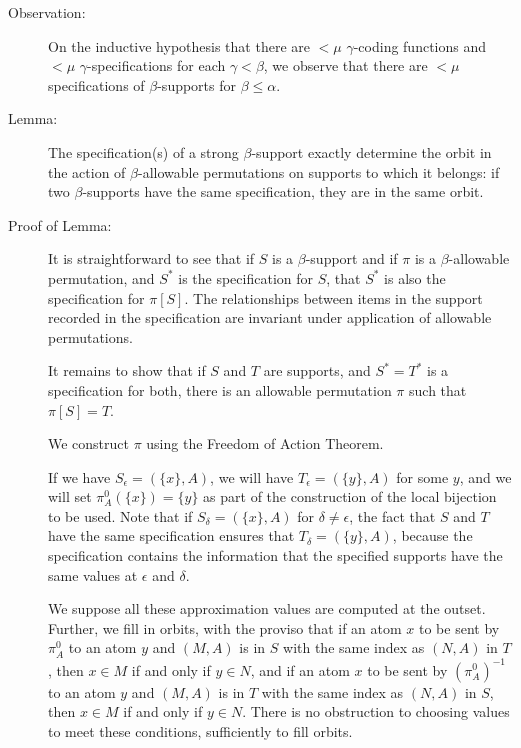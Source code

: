 \documentclass[112pt]{article}
\begin{document}
\begin{description}
\item[Observation:]  On the inductive hypothesis that there are $<\mu$ $\gamma$-coding functions and $<\mu$ $\gamma$-specifications for each $\gamma<\beta$, we observe that there are $<\mu$ specifications of $\beta$-supports for $\beta\leq \alpha$.

\item[Lemma:]  The specification(s) of a strong $\beta$-support exactly determine the orbit in the action of $\beta$-allowable permutations on supports to which it belongs:  if two $\beta$-supports have the same specification, they are in the same orbit.

\item[Proof of Lemma:]

It is straightforward to see that if $S$ is a $\beta$-support and if $\pi$ is a $\beta$-allowable permutation, and $S^*$ is the  specification for $S$, that $S^*$ is also the specification for $\pi[S]$.  The relationships between items in the support recorded in the specification are invariant under application of allowable permutations.

It remains to show that if $S$ and $T$ are supports, and $S^*=T^*$ is a specification for both, there is an allowable permutation $\pi$ such that $\pi[S]=T$.  

We construct $\pi$ using the Freedom of Action Theorem.

If we have $S_\epsilon = (\{x\},A)$, we will have $T_\epsilon = (\{y\},A)$ for some $y$, and we will set $\pi^0_A(\{x\}) = \{y\}$ as part of the construction of the local bijection to be used.     Note that if $S_\delta = (\{x\},A)$ for $\delta \neq \epsilon$, the fact that $S$ and
$T$ have the same specification ensures that $T_\delta = (\{y\},A)$, because the specification contains the information that the specified supports have the same values at $\epsilon$ and $\delta$.

We suppose all these approximation values are computed at the outset.  Further, we fill in orbits,
with the proviso that if an atom $x$  to be sent by $\pi^0_A$ to an atom $y$ and $(M,A)$ is in $S$ with the same index as $(N,A)$ in $T$, then $x \in M$ if and only if $y \in N$,   and if an atom $x$  to be sent by $(\pi^0_A)^{-1}$ to an atom $y$ and $(M,A)$ is in $T$ with the same index as $(N,A)$ in $S$, then $x \in M$ if and only if $y \in N$.  There is no obstruction to choosing values to meet these conditions, sufficiently to fill orbits.


\end{description}
\end{document}
